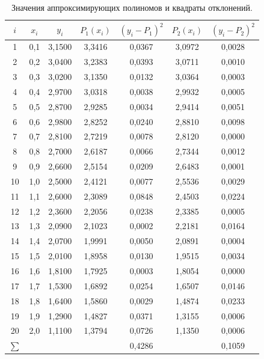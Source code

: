 \begin{table}[h!]
\centering
\small
\begin{tabular}{|c|c|c|c|c|c|c|}
\hline
$i$ & $x_i$ & $y_i$ & $P_1(x_i)$ & $(y_i - P_1)^2$ & $P_2(x_i)$ & $(y_i - P_2)^2$ \\
\hline
1  & 0,1 & 3,1500 & 3,3416 & 0,0367 & 3,0972 & 0,0028 \\
2  & 0,2 & 3,0400 & 3,2383 & 0,0393 & 3,0711 & 0,0010 \\
3  & 0,3 & 3,0200 & 3,1350 & 0,0132 & 3,0364 & 0,0003 \\
4  & 0,4 & 2,9700 & 3,0318 & 0,0038 & 2,9932 & 0,0005 \\
5  & 0,5 & 2,8700 & 2,9285 & 0,0034 & 2,9414 & 0,0051 \\
6  & 0,6 & 2,9800 & 2,8252 & 0,0240 & 2,8810 & 0,0098 \\
7  & 0,7 & 2,8100 & 2,7219 & 0,0078 & 2,8120 & 0,0000 \\
8  & 0,8 & 2,7000 & 2,6187 & 0,0066 & 2,7344 & 0,0012 \\
9  & 0,9 & 2,6600 & 2,5154 & 0,0209 & 2,6483 & 0,0001 \\
10 & 1,0 & 2,5000 & 2,4121 & 0,0077 & 2,5536 & 0,0029 \\
11 & 1,1 & 2,6000 & 2,3089 & 0,0848 & 2,4503 & 0,0224 \\
12 & 1,2 & 2,3600 & 2,2056 & 0,0238 & 2,3385 & 0,0005 \\
13 & 1,3 & 2,0900 & 2,1023 & 0,0002 & 2,2181 & 0,0164 \\
14 & 1,4 & 2,0700 & 1,9991 & 0,0050 & 2,0891 & 0,0004 \\
15 & 1,5 & 2,0100 & 1,8958 & 0,0130 & 1,9515 & 0,0034 \\
16 & 1,6 & 1,8100 & 1,7925 & 0,0003 & 1,8054 & 0,0000 \\
17 & 1,7 & 1,5300 & 1,6892 & 0,0254 & 1,6507 & 0,0146 \\
18 & 1,8 & 1,6400 & 1,5860 & 0,0029 & 1,4874 & 0,0233 \\
19 & 1,9 & 1,2900 & 1,4827 & 0,0371 & 1,3155 & 0,0006 \\
20 & 2,0 & 1,1100 & 1,3794 & 0,0726 & 1,1350 & 0,0006 \\
\hline
$\sum$ & & & & 0,4286 & & 0,1059 \\
\hline
\end{tabular}
\caption{Значения аппроксимирующих полиномов и квадраты отклонений.}
\label{tab:dev}
\end{table}